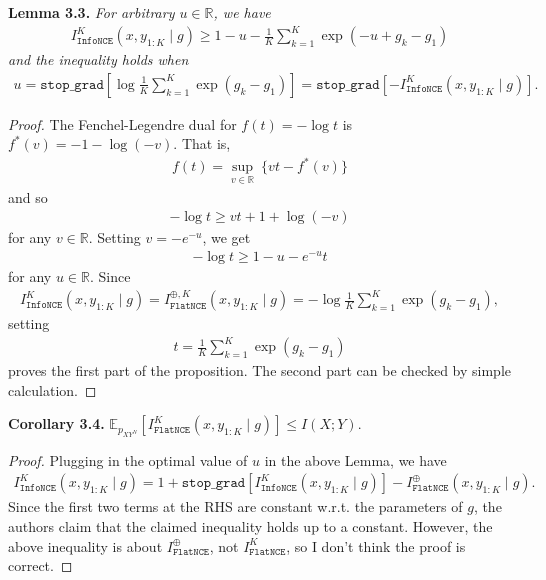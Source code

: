 \documentclass[10pt]{article}
\newcommand{\RR}{\mathbb{R}}
\newcommand{\EE}{\mathbb{E}}
\newcommand{\infonce}{\texttt{InfoNCE}}
\newcommand{\flatnce}{\texttt{FlatNCE}}
\newcommand{\stopg}{\texttt{stop\char`_grad}}
\begin{document}
\textbf{Lemma 3.3.} \textit{For arbitrary $u \in \RR$, we have}
\begin{align*}
I^K_\infonce(x,y_{1:K} \mid g) \geq 1 - u - \frac{1}{K} \sum_{k = 1}^K \exp(-u + g_k - g_1)
\end{align*}
\textit{and the inequality holds when}
\begin{align*}
u = \stopg \left[ \log \frac{1}{K} \sum_{k = 1}^K \exp(g_k - g_1) \right] = \stopg \left[ -I^K_\infonce(x,y_{1:K} \mid g) \right].
\end{align*}
\begin{proof}
The Fenchel-Legendre dual for $f(t) = - \log t$ is $f^*(v) = -1 - \log(-v)$. That is,
\begin{align*}
f(t) = \sup_{v \in \RR} \ \{vt - f^*(v)\}
\end{align*}
and so
\begin{align*}
- \log t \geq vt + 1 + \log(-v)
\end{align*}
for any $v \in \RR$. Setting $v = -e^{-u}$, we get
\begin{align*}
- \log t \geq 1 - u - e^{-u} t
\end{align*}
for any $u \in \RR$. Since
\begin{align*}
I^K_\infonce(x,y_{1:K} \mid g) = I^{\oplus,K}_\flatnce(x,y_{1:K} \mid g) = - \log \frac{1}{K} \sum_{k = 1}^K \exp(g_k - g_1),
\end{align*}
setting
\begin{align*}
t = \frac{1}{K} \sum_{k = 1}^K \exp(g_k - g_1)
\end{align*}
proves the first part of the proposition. The second part can be checked by simple calculation.
\end{proof}

\textbf{Corollary 3.4.} $\EE_{p_{XY^N}} \left[ I^K_\flatnce(x,y_{1:K} \mid g) \right] \leq I(X;Y)$.
\begin{proof}
Plugging in the optimal value of $u$ in the above Lemma, we have
\begin{align*}
I^K_\infonce(x,y_{1:K} \mid g) = 1 + \stopg \left[ I^K_\infonce(x,y_{1:K} \mid g) \right] - I^\oplus_\flatnce(x,y_{1:K} \mid g).
\end{align*}
Since the first two terms at the RHS are constant w.r.t. the parameters of $g$, the authors claim that the claimed inequality holds up to a constant. However, the above inequality is about $I^\oplus_\flatnce$, not $I^K_\flatnce$, so I don't think the proof is correct.
\end{proof}
\end{document}
